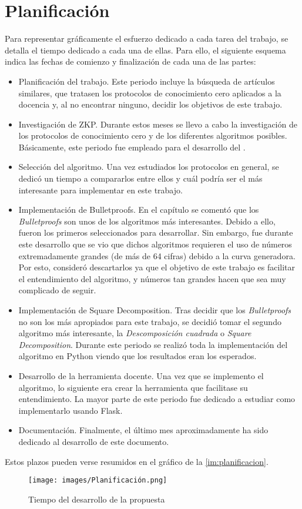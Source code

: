 \section{Planificación}

Para representar gráficamente el esfuerzo dedicado a cada tarea del trabajo, se detalla el tiempo dedicado a cada una de ellas. Para ello, el siguiente esquema indica las fechas de comienzo y finalización de cada una de las partes:
\begin{itemize}
    \item Planificación del trabajo. Este periodo incluye la búsqueda de artículos similares, que tratasen los protocolos de conocimiento cero aplicados a la docencia y, al no encontrar ninguno, decidir los objetivos de este trabajo.

    \item Investigación de ZKP. Durante estos meses se llevo a cabo la investigación de los protocolos de conocimiento cero y de los diferentes algoritmos posibles. Básicamente, este periodo fue empleado para el desarrollo del .

    \item Selección del algoritmo. Una vez estudiados los protocolos en general, se dedicó un tiempo a compararlos entre ellos y cuál podría ser el más interesante para implementar en este trabajo.

    \item Implementación de Bulletproofs. En el capítulo  se comentó que los \emph{Bulletproofs} son unos de los algoritmos más interesantes. Debido a ello, fueron los primeros seleccionados para desarrollar. Sin embargo, fue durante este desarrollo que se vio que dichos algoritmos requieren el uso de números extremadamente grandes (de más de 64 cifras) debido a la curva generadora. Por esto, consideró descartarlos ya que el objetivo de este trabajo es facilitar el entendimiento del algoritmo, y números tan grandes hacen que sea muy complicado de seguir.

    \item Implementación de Square Decomposition. Tras decidir que los \emph{Bulletproofs} no son los más apropiados para este trabajo, se decidió tomar el segundo algoritmo más interesante, la \emph{Descomposición cuadrada} o \emph{Square Decomposition}. Durante este periodo se realizó toda la implementación del algoritmo en Python viendo que los resultados eran los esperados.

    \item Desarrollo de la herramienta docente. Una vez que se implemento el algoritmo, lo siguiente era crear la herramienta que facilitase su entendimiento. La mayor parte de este periodo fue dedicado a estudiar como implementarlo usando Flask.

    \item Documentación. Finalmente, el último mes aproximadamente ha sido dedicado al desarrollo de este documento.
\end{itemize}

Estos plazos pueden verse resumidos en el gráfico de la \autoref{im:planificacion}.
\begin{sidewaysfigure}[hbtp]
    \centering
    \texttt{[image: images/Planificación.png]}
    \caption{Tiempo del desarrollo de la propuesta}
    \label{im:planificacion}
\end{sidewaysfigure}
